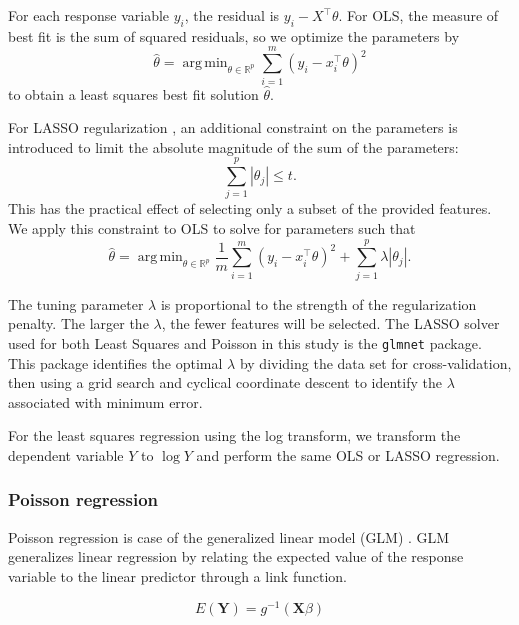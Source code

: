 \documentclass[11pt]{article}
\DeclareMathOperator*{\argmin}{arg\,min}
\begin{document}
For each response variable $y_i$, the residual is $y_i - X^\top\theta$. For OLS, the measure of best fit is the sum of squared residuals, so we optimize the parameters by
\[\hat{\theta} = \argmin_{\theta\in\mathbb{R}^p}\sum_{i=1}^m \left(y_i - x_i^\top\theta\right)^2\] to obtain a least squares best fit solution $\hat{\theta}$.

For LASSO regularization \cite{Tibshirani1996}, an additional constraint on the parameters is introduced to limit the absolute magnitude of the sum of the parameters: 
\[\sum_{j=1}^p |\theta_j|\leq t.\] This has the practical effect of selecting only a subset of the provided features. We apply this constraint to OLS to solve for parameters such that
\[\hat{\theta} = \argmin_{\theta\in\mathbb{R}^p} \frac{1}{m}\sum_{i=1}^m \left(y_i - x_i^\top\theta\right)^2 + \sum_{j=1}^p\lambda\left|\theta_j\right|.\]

The tuning parameter $\lambda$ is proportional to the strength of the regularization penalty. The larger the $\lambda$, the fewer features will be selected. The LASSO solver used for both Least Squares and Poisson in this study is the \texttt{glmnet} package. This package identifies the optimal $\lambda$ by dividing the data set for cross-validation, then using a grid search and cyclical coordinate descent to identify the $\lambda$ associated with minimum error.

For the least squares regression using the log transform, we transform the dependent variable $Y$ to $\log{Y}$ and perform the same OLS or LASSO regression.

\subsubsection{Poisson regression} \label{sec:poiss}

Poisson regression is case of the generalized linear model (GLM) \cite{nelder1972}. GLM generalizes linear regression by relating the expected value of the response variable to the linear predictor through a link function. 

\[E(\mathbf{Y}) = g^{-1}(\mathbf{X}\beta)\]
\end{document}
